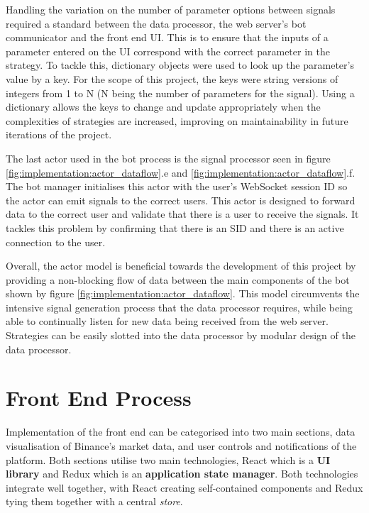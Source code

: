
Handling the variation on the number of parameter options between signals required a standard between the data processor, the web server's bot communicator and the front end UI. This is to ensure that the inputs of a parameter entered on the UI correspond with the correct parameter in the strategy. To tackle this, dictionary objects were used to look up the parameter's value by a key. For the scope of this project, the keys were string versions of integers from 1 to N (N being the number of parameters for the signal). Using a dictionary allows the keys to change and update appropriately when the complexities of strategies are increased, improving on maintainability in future iterations of the project.

The last actor used in the bot process is the signal processor seen in figure \ref{fig:implementation:actor_dataflow}.e and \ref{fig:implementation:actor_dataflow}.f. The bot manager initialises this actor with the user's WebSocket session ID so the actor can emit signals to the correct users. This actor is designed to forward data to the correct user and validate that there is a user to receive the signals. It tackles this problem by confirming that there is an SID and there is an active connection to the user. 

Overall, the actor model is beneficial towards the development of this project by providing a non-blocking flow of data between the main components of the bot shown by figure \ref{fig:implementation:actor_dataflow}. This model circumvents the intensive signal generation process that the data processor requires, while being able to continually listen for new data being received from the web server. Strategies can be easily slotted into the data processor by modular design of the data processor. 



\section{Front End Process}
\label{sec:implementation:frontend}

\noindent Implementation of the front end can be categorised into two main sections, data visualisation of Binance's market data, and user controls and notifications of the platform. Both sections utilise two main technologies, React which is a \textbf{UI library} and Redux which is an \textbf{application state manager}. Both technologies integrate well together, with React creating self-contained components and Redux tying them together with a central \textit{store}.

